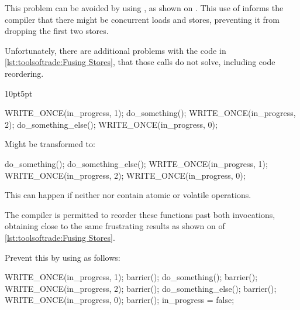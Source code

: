 \begin{description}[labelsep=.4em]
\begin{fcvref}
This problem can  be avoided by using , as shown
on .
This use of  informs the compiler that there might
be concurrent loads and stores, preventing it from dropping the
first two stores.

Unfortunately, there are additional problems with the code in
\cref{lst:toolsoftrade:Fusing Stores},
that those  calls do not solve, including code
reordering.
\end{fcvref}

\begin{listing}[tb]
\begin{adjustwidth}{10pt}{5pt}
\footnotesize
\begin{fcvlabel}
\renewcommand{\myfvline}{A\arabic{FancyVerbLine}}
\begin{VerbatimT}[commandchars=\\\[\]]
WRITE_ONCE(in_progress, 1);		\lnlbl[A1]
do_something();				\lnlbl[A2]
WRITE_ONCE(in_progress, 2);		\lnlbl[A3]
do_something_else();			\lnlbl[A4]
WRITE_ONCE(in_progress, 0);		\lnlbl[A5]
\end{VerbatimT}
Might be transformed to:
\renewcommand{\myfvline}{B\arabic{FancyVerbLine}}
\begin{VerbatimT}[commandchars=\\\[\]]
do_something();				\lnlbl[B1]
do_something_else();			\lnlbl[B2]
WRITE_ONCE(in_progress, 1);		\lnlbl[B3]
WRITE_ONCE(in_progress, 2);		\lnlbl[B4]
WRITE_ONCE(in_progress, 0);		\lnlbl[B5]
\end{VerbatimT}
This can happen if neither  nor
 contain atomic or volatile operations.
\begin{fcvref}
The compiler is permitted to reorder these functions past both
 invocations, obtaining close to the same
frustrating results as shown on  of
\cref{lst:toolsoftrade:Fusing Stores}.
\end{fcvref}
Prevent this by using  as follows:
\renewcommand{\myfvline}{C\arabic{FancyVerbLine}}
\begin{VerbatimT}[commandchars=\\\[\]]
WRITE_ONCE(in_progress, 1);		\lnlbl[C1]
barrier();				\lnlbl[C2]
do_something();				\lnlbl[C3]
barrier();				\lnlbl[C4]
WRITE_ONCE(in_progress, 2);		\lnlbl[C5]
barrier();				\lnlbl[C6]
do_something_else();			\lnlbl[C7]
barrier();				\lnlbl[C8]
WRITE_ONCE(in_progress, 0);		\lnlbl[C9]
barrier();				\lnlbl[C10]
in_progress = false;			\lnlbl[C11]
\end{VerbatimT}
\end{fcvlabel}
\end{adjustwidth}
\caption{Reordering Code}
\label{lst:toolsoftrade:Reordering Code}
\end{listing}


\end{description}
